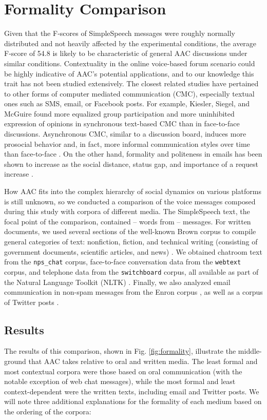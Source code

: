 \section{Formality Comparison}
Given that the F-scores of SimpleSpeech messages were roughly normally distributed and not heavily affected by the experimental conditions, the average F-score of 54.8 is likely to be characteristic of general AAC discussions under similar conditions.
Contextuality in the online voice-based forum scenario could be highly indicative of AAC's potential applications, and to our knowledge this trait has not been studied extensively.
The closest related studies have pertained to other forms of computer mediated communication (CMC), especially textual ones such as SMS, email, or Facebook posts.
For example, Kiesler, Siegel, and McGuire \cite{kiesler} found more equalized group participation and more uninhibited expression of opinions in synchronous text-based CMC than in face-to-face discussions.
Asynchronous CMC, similar to a discussion board, induces more prosocial behavior and, in fact, more informal communication styles over time than face-to-face \cite{walther}.
On the other hand, formality and politeness in emails has been shown to increase as the social distance, status gap, and importance of a request increase \cite{cho}.

How AAC fits into the complex hierarchy of social dynamics on various platforms is still unknown, so we conducted a comparison of the voice messages composed during this study with corpora of different media.
The SimpleSpeech text, the focal point of the comparison, contained -- words from -- messages.
For written documents, we used several sections of the well-known Brown corpus to compile general categories of text: nonfiction, fiction, and technical writing (consisting of government documents, scientific articles, and news) \cite{brown}.
We obtained chatroom text from the \texttt{nps\_chat} corpus, face-to-face conversation data from the \texttt{webtext} corpus, and telephone data from the \texttt{switchboard} corpus, all available as part of the Natural Language Toolkit (NLTK) \cite{nltk}.
Finally, we also analyzed email communication in non-spam messages from the Enron corpus \cite{enronsent}, as well as a corpus of Twitter posts \cite{twitter}.

\subsection{Results}
The results of this comparison, shown in Fig. \ref{fig:formality}, illustrate the middle-ground that AAC takes relative to oral and written media. 
The least formal and most contextual corpora were those based on oral communication (with the notable exception of web chat messages), while the most formal and least context-dependent were the written texts, including email and Twitter posts. 
We will note three additional explanations for the formality of each medium based on the ordering of the corpora:

